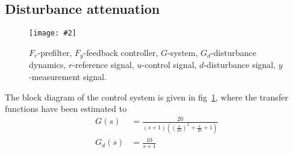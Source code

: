 \documentclass[11pt,a4paper]{article}
\newcommand{\image}[3]{
	\begin{figure}[!ht]
		\centering
	    \texttt{[image: \#2]}
		\caption{#3}
		\label{fig:#2}
	\end{figure}
}
\begin{document}
\subsection{Disturbance attenuation}
\image{0.75}{system2}{$F_{r}$-prefilter, $F_{y}$-feedback controller, $G$-system, $G_{d}$-disturbance dynamics, $r$-reference signal, $u$-control signal, $d$-disturbance signal, $y$-measurement signal.}

\par The block diagram of the control system is given in fig~\ref{fig:system2}, where the transfer functions have been estimated to
\begin{align*}
	G(s) &= \frac{20}{(s+1)((\frac{s}{20})^{2}+\frac{s}{20}+1)} \\
	G_{d}(s) &= \frac{10}{s+1}
\end{align*}
\end{document}
